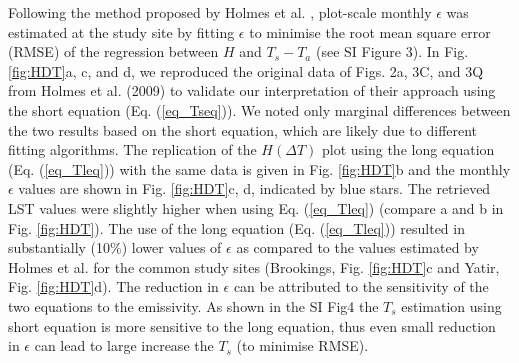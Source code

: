 \documentclass[fleqn,10pt]{wlscirep}
\begin{document}
Following the method proposed by Holmes et al. \cite{holmes2009land, holmes2016cloud}, plot-scale monthly $\epsilon$ was estimated at the study site by fitting $\epsilon$ to minimise the root mean square error (RMSE) of the regression between $H$ and $T_s - T_a$ (see SI Figure 3). In Fig. \ref{fig:HDT}a, c, and d, we reproduced the original data of Figs. 2a, 3C, and 3Q from Holmes et al. (2009) \cite{holmes2009land} to validate our interpretation of their approach using the short equation (Eq. (\ref{eq_Tseq})). We noted only marginal differences between the two results based on the short equation, which are likely due to different fitting algorithms. The replication of the $H (\Delta T)$ plot using the long equation (Eq. (\ref{eq_Tleq})) with the same data is given in Fig. \ref{fig:HDT}b and the monthly $\epsilon$ values are shown in Fig. \ref{fig:HDT}c, d, indicated by blue stars. The retrieved LST values were slightly higher when using Eq. (\ref{eq_Tleq}) (compare a and b in Fig. \ref{fig:HDT}). The use of the long equation (Eq. (\ref{eq_Tleq})) resulted in substantially (10\%) lower values of $\epsilon$ as compared to the values estimated by Holmes et al.\cite{holmes2009land} for the common study sites (Brookings, Fig. \ref{fig:HDT}c and Yatir, Fig. \ref{fig:HDT}d). The reduction in $\epsilon$ can be attributed to the sensitivity of the two equations to the emissivity. As shown in the SI Fig4 the $T_{s}$ estimation using short equation is more sensitive to the long equation, thus even small reduction in $\epsilon$ can lead to large increase the $T_{s}$ (to minimise RMSE). 
\end{document}
